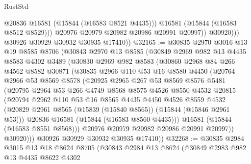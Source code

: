 \begin{lexlean}{RustStd}
\begin{coremodule}
                      @20836
                      @16581
                      (@15844 (@16583 @8521 @4435)))
                    @16581
                    (@15844 (@16583 @8512 @8529)))
                  @20976
                  @20979
                  @20982
                  @20986
                  @20991
                  @20997))
              @30920)))
        @30926
        @30929
        @30932
        @30935
        @17410))
@32165 := @30835
    @2970
    @3016
    @13
    @19
    @8585
    @8706
    (@30843
      @2970
      @13
      @8585
      (@30849
        @2969
        @982
        @13
        @4435
        @8583
        @4302
        @3489
        (@30830
          @2969
          @982
          @8583
          (@30860
            @2968
            @84
            @266
            @4562
            @8582
            @30871
            (@30835
              @2966
              @110
              @53
              @16
              @8580
              @4450
              (@20764
                @2966
                @53
                @8569
                @8578
                (@20925
                  @2965
                  @267
                  @53
                  @8569
                  @8576
                  @5481
                  (@20795
                    @2964
                    @53
                    @266
                    @4749
                    @8568
                    @8575
                    @4526
                    @8550
                    @4532
                    @20815
                    (@20794
                      @2962
                      @110
                      @53
                      @16
                      @8565
                      @4435
                      @4450
                      @4526
                      @8559
                      @4532
                      (@20829 @2961 @8565 (@15839 (@15840 @8565)) (@15844 (@15846 @2961 @53)))
                      @20836
                      @16581
                      (@15844 (@16583 @8560 @4435)))
                    @16581
                    (@15844 (@16583 @8551 @8568)))
                  @20976
                  @20979
                  @20982
                  @20986
                  @20991
                  @20997))
              @30920)))
        @30926
        @30929
        @30932
        @30935
        @17410))
@32268 := @30835
    @2984
    @3015
    @13
    @18
    @8624
    @8705
    (@30843
      @2984
      @13
      @8624
      (@30849
        @2983
        @982
        @13
        @4435
        @8622
        @4302

\end{coremodule}
\end{lexlean}
